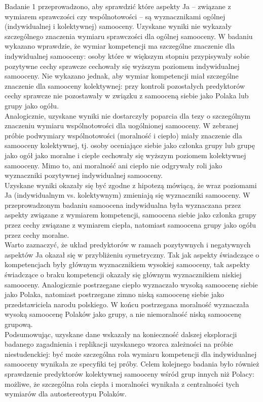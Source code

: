 \documentclass[man]{apa6}
\begin{document}
Badanie 1 przeprowadzono, aby sprawdzić które aspekty Ja -- związane z wymiarem sprawczości czy wspólnotowości -- są wyznacznikami ogólnej (indywidualnej i kolektywnej) samooceny. Uzyskane wyniki nie wykazały szczególnego znaczenia wymiaru sprawczości dla ogólnej samooceny. W badaniu wykazano wprawdzie, że wymiar kompetencji ma szczególne znaczenie dla indywidualnej samooceny: osoby które w większym stopniu przypisywały sobie pozytywne cechy sprawcze cechowały się wyższym poziomem indywidualnej samooceny. Nie wykazano jednak, aby wymiar kompetencji miał szczególne znaczenie dla samooceny kolektywnej: przy kontroli pozostałych predyktorów cechy sprawcze nie pozostawały w związku z samooceną siebie jako Polaka lub grupy jako ogółu. \\
Analogicznie, uzyskane wyniki nie dostarczyły poparcia dla tezy o szczególnym znaczeniu wymiaru wspólnotowości dla uogólnionej samooceny. W zebranej próbie podwymiary wspólnotowości (moralność i ciepło) miały znaczenie dla samooceny kolektywnej, tj. osoby oceniające siebie jako członka grupy lub grupę jako ogół jako moralne i ciepłe cechowały się wyższym poziomem kolektywnej samooceny. Mimo to, ani moralność ani ciepło nie odgrywały roli jako wyznaczniki pozytywnej indywidualnej samooceny.\\
Uzyskane wyniki okazały się być zgodne z hipotezą mówiącą, że wraz poziomami Ja (indywidualnym vs. kolektywnym) zmieniają się wyznaczniki samooceny. W przeprowadzonym badaniu samoocena indywidualna była wyznaczana przez aspekty związane z wymiarem kompetencji, samoocena siebie jako członka grupy przez cechy związane z wymiarem ciepła, natomiast samoocena grupy jako ogółu przez cechy moralne. \\
Warto zaznaczyć, że układ predyktorów w ramach pozytywnych i negatywnych aspektów Ja okazał się w przybliżeniu symetryczny. Tak jak aspekty świadczące o kompetencjach były głównym wyznacznikiem wysokiej samooceny, tak aspekty świadczące o braku kompetencji okazały się głównym wyznacznikiem niskiej samooceny. Analogicznie postrzegane ciepło wyznaczało wysoką samoocenę siebie jako Polaka, natomiast postrzegane zimno niską samoocenę siebie jako przedstawiciela narodu polskiego. W końcu postrzegana moralność wyznaczała wysoką samoocenę Polaków jako grupy, a nie niemoralność niską samoocenę grupową. \\
Podsumowując, uzyskane dane wskazały na konieczność dalszej eksploracji badanego zagadnienia i replikacji uzyskanego wzorca zależności na próbie niestudenckiej: być może szczególna rola wymiaru kompetencji dla indywidualnej samooceny wynikała ze specyfiki tej próby. Celem kolejnego badania było również sprawdzenie predyktorów kolektywnej samooceny wśród grup innych niż Polacy: możliwe, że szczególna rola ciepła i moralności wynikała z centralności tych wymiarów dla autostereotypu Polaków. \\
\end{document}

